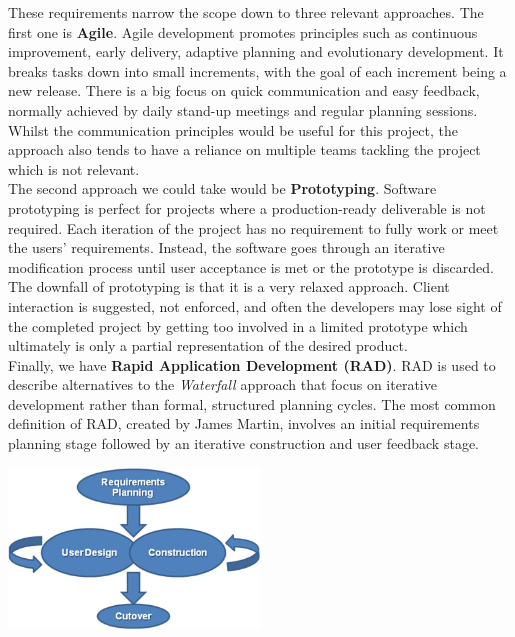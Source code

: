 These requirements narrow the scope down to three relevant approaches.  The first one is \textbf{Agile}.  Agile development promotes principles such as continuous improvement, early delivery, adaptive planning and evolutionary development. It breaks tasks down into small increments, with the goal of each increment being a new release. There is a big focus on quick communication and easy feedback, normally achieved by daily stand-up meetings and regular planning sessions. Whilst the communication principles would be useful for this project, the approach also tends to have a reliance on multiple teams tackling the project which is not relevant.\\
The second approach we could take would be \textbf{Prototyping}.  Software prototyping is perfect for projects where a production-ready deliverable is not required. Each iteration of the project has no requirement to fully work or meet the users' requirements. Instead, the software goes through an iterative modification process until user acceptance is met or the prototype is discarded.  The downfall of prototyping is that it is a very relaxed approach. Client interaction is suggested, not enforced, and often the developers may lose sight of the completed project by getting too involved in a limited prototype which ultimately is only a partial representation of the desired product.\\
Finally, we have \textbf{Rapid Application Development (RAD)}.  RAD is used to describe alternatives to the \emph{Waterfall} approach that focus on iterative development rather than formal, structured planning cycles. The most common definition of RAD, created by James Martin, involves an initial requirements planning stage followed by an iterative construction and user feedback stage.\\

    \begin{minipage}{\linewidth}
      \centering
      \includegraphics[width=0.5\textwidth]{./img/rad-model.jpg}
    \end{minipage}\\

